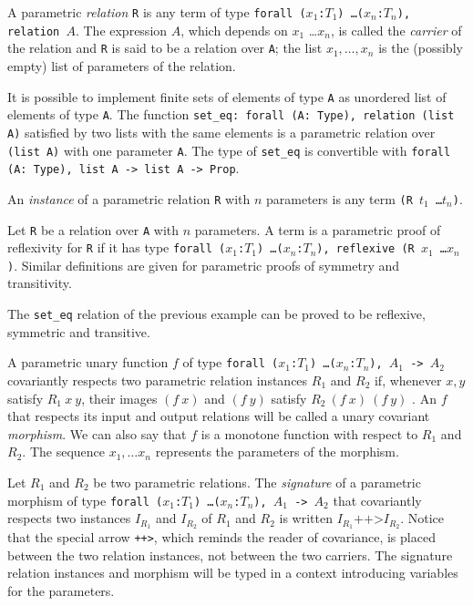 
A parametric \emph{relation} \texttt{R} is any term of type
\texttt{forall ($x_1$:$T_1$) \ldots ($x_n$:$T_n$), relation $A$}. The
expression $A$, which depends on $x_1$ \ldots $x_n$, is called the
\emph{carrier} of the relation and \texttt{R} is
said to be a relation over \texttt{A}; the list $x_1,\ldots,x_n$
is the (possibly empty) list of parameters of the relation.

\firstexample
\begin{cscexample}
It is possible to implement finite sets of elements of type \texttt{A}
as unordered list of elements of type \texttt{A}. The function
\texttt{set\_eq: forall (A: Type), relation (list A)} satisfied by two lists
with the same elements is a parametric relation over \texttt{(list A)} with
one parameter \texttt{A}. The type of \texttt{set\_eq} is convertible with
\texttt{forall (A: Type), list A -> list A -> Prop}.
\end{cscexample}

An \emph{instance} of a parametric relation \texttt{R} with $n$ parameters
is any term \texttt{(R $t_1$ \ldots $t_n$)}.

Let \texttt{R} be a relation over \texttt{A} with $n$ parameters.
A term is a parametric proof of reflexivity for \texttt{R} if it has type
\texttt{forall ($x_1$:$T_1$) \ldots ($x_n$:$T_n$),
 reflexive (R $x_1$ \ldots $x_n$)}. Similar definitions are given for
parametric proofs of symmetry and transitivity.

\begin{cscexample}
The \texttt{set\_eq} relation of the previous example can be proved to be
reflexive, symmetric and transitive.
\end{cscexample}

A parametric unary function $f$ of type
\texttt{forall ($x_1$:$T_1$) \ldots ($x_n$:$T_n$), $A_1$ -> $A_2$}
covariantly respects two parametric relation instances $R_1$ and $R_2$ if,
whenever $x, y$ satisfy $R_1~x~y$, their images $(f~x)$ and $(f~y)$ 
satisfy $R_2~(f~x)~(f~y)$ . An $f$ that respects its input and output relations
will be called a unary covariant \emph{morphism}. We can also say that $f$ is
a monotone function with respect to $R_1$ and $R_2$. 
The sequence $x_1,\ldots x_n$ represents the parameters of the morphism.

Let $R_1$ and $R_2$ be two parametric relations.
The \emph{signature} of a parametric morphism of type
\texttt{forall ($x_1$:$T_1$) \ldots ($x_n$:$T_n$), $A_1$ -> $A_2$} that
covariantly respects two instances $I_{R_1}$ and $I_{R_2}$ of $R_1$ and $R_2$ is written $I_{R_1} \texttt{++>} I_{R_2}$.
Notice that the special arrow \texttt{++>}, which reminds the reader
of covariance, is placed between the two relation instances, not
between the two carriers. The signature relation instances and morphism will
be typed in a context introducing variables for the parameters.

